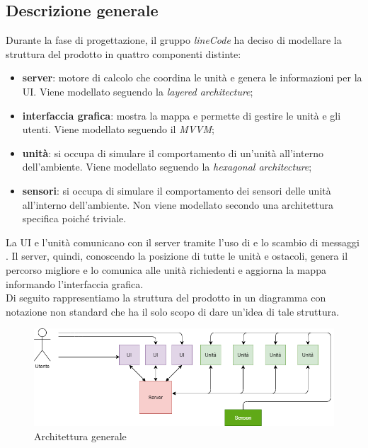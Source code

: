 \subsection{Descrizione generale}
Durante la fase di progettazione, il gruppo \textit{lineCode} ha deciso di modellare la struttura del prodotto in quattro componenti distinte:
\begin{itemize}
	\item \textbf{server}: motore di calcolo che coordina le unità e genera le informazioni per la UI. Viene modellato seguendo la \textit{layered architecture};
	\item \textbf{interfaccia grafica}: mostra la mappa e permette di gestire le unità e gli utenti. Viene modellato seguendo il \textit{MVVM};
	\item \textbf{unità}: si occupa di simulare il comportamento di un'unità all'interno dell'ambiente. Viene modellato seguendo la \textit{hexagonal architecture};
	\item \textbf{sensori}: si occupa di simulare il comportamento dei sensori delle unità all'interno dell'ambiente. Non viene modellato secondo una architettura specifica poiché triviale.
\end{itemize}
La UI e l'unità comunicano con il server tramite l'uso di  e lo scambio di messaggi . Il server, quindi, conoscendo la posizione di tutte le unità e ostacoli, genera il percorso migliore e lo comunica alle unità richiedenti e aggiorna la mappa informando l'interfaccia grafica.\\
Di seguito rappresentiamo la struttura del prodotto in un diagramma con notazione non standard che ha il solo scopo di dare un'idea di tale struttura.

\vspace{2cm}

\begin{figure}[H]
	\centering
	\includegraphics[width=18cm]{img/arch_generale.png}
	\caption{Architettura generale}
\end{figure}
